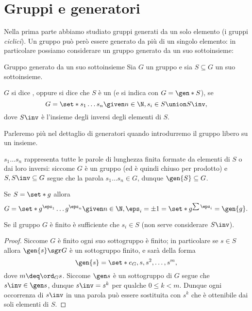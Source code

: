 \section{Gruppi e generatori}

Nella prima parte abbiamo studiato gruppi generati da un solo elemento (i gruppi \emph{ciclici}). Un gruppo può però essere generato da più di un singolo elemento: in particolare possiamo considerare un gruppo generato da un suo sottoinsieme:

\begin{definition}
    {Gruppo generato da un suo sottoinsieme}{}
    Sia $G$ un gruppo e sia $S \subseteq G$ un suo sottoinsieme.
    
    $G$ si dice , oppure si dice che $S$ è un  (e si indica con $G = \gen*{S}$), se \[
        G = \set*{s_1\dots s_n \given n \in \N, s_i \in S \union S\inv},
    \] dove $S\inv$ è l'insieme degli inversi degli elementi di $S$.
\end{definition}

Parleremo più nel dettaglio di generatori quando introdurremo il gruppo libero su un insieme.

\begin{remark}
    $s_1 \dots s_n$ rappresenta tutte le parole di lunghezza finita formate da elementi di $S$ o dai loro inversi: siccome $G$ è un gruppo (ed è quindi chiuso per prodotto) e $S, S\inv \subseteq G$ segue che la parola $s_1 \dots s_n \in G$, dunque $\gen{S} \subseteq G$.
\end{remark}

\begin{remark}
    Se $S = \set*{g}$ allora \[
        G = \set*{g^{\eps_1}\dots g^{\eps_n} \given n \in \N, \eps_i = \pm 1} = \set*{g^{\sum \eps_i}} = \gen{g}.
    \]
\end{remark}

\begin{remark}
    Se il gruppo $G$ è finito è sufficiente che $s_i \in S$ (non serve considerare $S\inv$).
    \begin{proof}
        Siccome $G$ è finito ogni suo sottogruppo è finito; in particolare se $s \in S$ allora $\gen{s} \sgr G$ è un sottogruppo finito, e sarà della forma \[
            \gen{s} = \set*{e_G, s, s^2, \dots, s^m},    
        \] dove $m \deq \ord_{G}{s}$.
        Siccome $\gen s$ è un sottogruppo di $G$ segue che $s\inv \in \gen s$, dunque $s\inv = s^k$ per qualche $0 \leq k < m$.
        Dunque ogni occorrenza di $s\inv$ in una parola può essere sostituita con $s^k$ che è ottenibile dai soli elementi di $S$. 
    \end{proof}
\end{remark}

